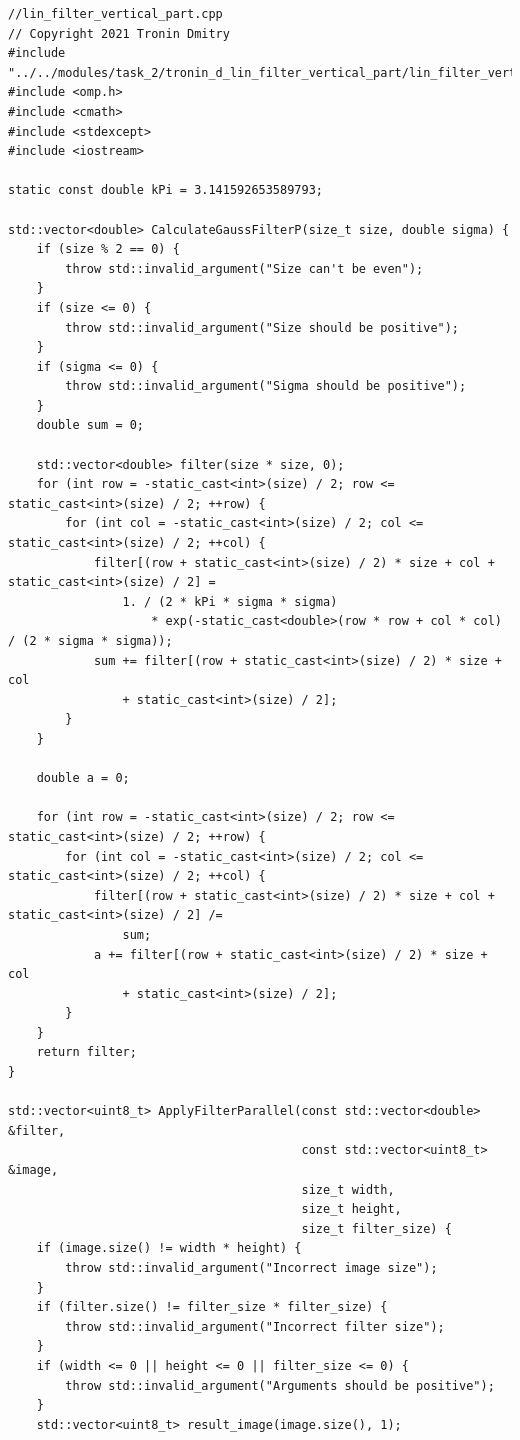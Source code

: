 \documentclass{report}
\begin{document}
\begin{lstlisting}[breaklines=true]
//lin_filter_vertical_part.cpp
// Copyright 2021 Tronin Dmitry
#include "../../modules/task_2/tronin_d_lin_filter_vertical_part/lin_filter_vertical_part.h"
#include <omp.h>
#include <cmath>
#include <stdexcept>
#include <iostream>

static const double kPi = 3.141592653589793;

std::vector<double> CalculateGaussFilterP(size_t size, double sigma) {
    if (size % 2 == 0) {
        throw std::invalid_argument("Size can't be even");
    }
    if (size <= 0) {
        throw std::invalid_argument("Size should be positive");
    }
    if (sigma <= 0) {
        throw std::invalid_argument("Sigma should be positive");
    }
    double sum = 0;

    std::vector<double> filter(size * size, 0);
    for (int row = -static_cast<int>(size) / 2; row <= static_cast<int>(size) / 2; ++row) {
        for (int col = -static_cast<int>(size) / 2; col <= static_cast<int>(size) / 2; ++col) {
            filter[(row + static_cast<int>(size) / 2) * size + col + static_cast<int>(size) / 2] =
                1. / (2 * kPi * sigma * sigma)
                    * exp(-static_cast<double>(row * row + col * col) / (2 * sigma * sigma));
            sum += filter[(row + static_cast<int>(size) / 2) * size + col
                + static_cast<int>(size) / 2];
        }
    }

    double a = 0;

    for (int row = -static_cast<int>(size) / 2; row <= static_cast<int>(size) / 2; ++row) {
        for (int col = -static_cast<int>(size) / 2; col <= static_cast<int>(size) / 2; ++col) {
            filter[(row + static_cast<int>(size) / 2) * size + col + static_cast<int>(size) / 2] /=
                sum;
            a += filter[(row + static_cast<int>(size) / 2) * size + col
                + static_cast<int>(size) / 2];
        }
    }
    return filter;
}

std::vector<uint8_t> ApplyFilterParallel(const std::vector<double> &filter,
                                         const std::vector<uint8_t> &image,
                                         size_t width,
                                         size_t height,
                                         size_t filter_size) {
    if (image.size() != width * height) {
        throw std::invalid_argument("Incorrect image size");
    }
    if (filter.size() != filter_size * filter_size) {
        throw std::invalid_argument("Incorrect filter size");
    }
    if (width <= 0 || height <= 0 || filter_size <= 0) {
        throw std::invalid_argument("Arguments should be positive");
    }
    std::vector<uint8_t> result_image(image.size(), 1);


\end{lstlisting}
\end{document}

